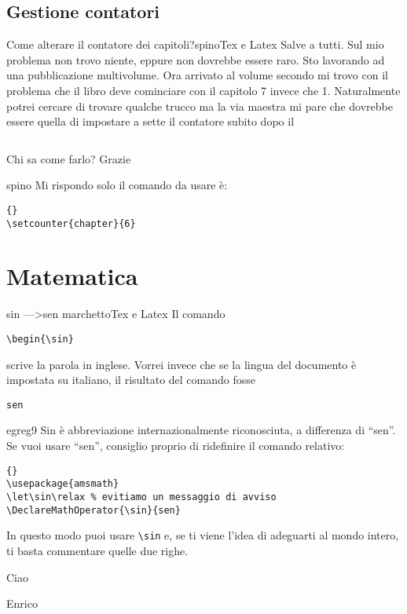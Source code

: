 \subsection{Gestione contatori}
\begin{domanda}{Come alterare il contatore dei capitoli?}{spino}{Tex e Latex}
Salve a tutti. Sul mio problema non trovo niente, eppure non dovrebbe essere raro.
Sto lavorando ad una pubblicazione multivolume. 
Ora arrivato al volume secondo mi trovo con il problema che il libro deve cominciare con il capitolo 7 invece che 1.
Naturalmente potrei cercare di trovare qualche trucco ma la via maestra mi pare che dovrebbe essere quella di impostare a sette il contatore subito dopo il 
\begin{lstlisting}

\end{lstlisting} Chi sa come farlo?
Grazie 
\end{domanda}
\begin{risposta}{spino}
Mi rispondo solo il comando  da usare è: 
\begin{lstlisting}{}
\setcounter{chapter}{6}
\end{lstlisting}
\end{risposta}
\section{Matematica}
\label{sec:TexMatematica}
\begin{domanda}{sin --->sen }{marchetto}{Tex e Latex}
Il comando
\begin{lstlisting}
\begin{\sin}
\end{lstlisting}
scrive la parola in inglese. Vorrei invece che se la lingua del documento è impostata su italiano, il risultato del comando fosse 
\begin{lstlisting}
sen
\end{lstlisting}
\end{domanda}
\begin{risposta}{egreg9}
Sin è abbreviazione internazionalmente riconosciuta, a differenza di “sen”. Se vuoi usare “sen”, consiglio proprio di ridefinire il comando relativo:
\begin{lstlisting}{}
\usepackage{amsmath}
\let\sin\relax % evitiamo un messaggio di avviso
\DeclareMathOperator{\sin}{sen}
\end{lstlisting}
In questo modo puoi usare \lstinline$\sin$ e, se ti viene l'idea di adeguarti al mondo intero, ti basta commentare quelle due righe.

Ciao

Enrico 

\end{risposta}